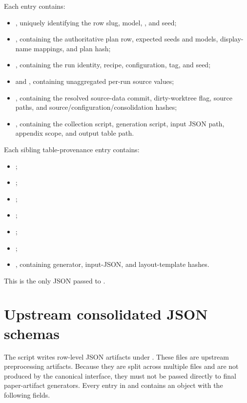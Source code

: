 \documentclass[11pt]{article}
\begin{document}
Each entry contains:
\begin{itemize}
  \item {}, uniquely identifying the row slug, model, \termSimulator, and seed;
  \item {}, containing the authoritative plan row, expected seeds and models, display-name mappings, and plan hash;
  \item {}, containing the run identity, recipe, configuration, tag, and seed;
  \item {} and , containing unaggregated per-run source values;
  \item {}, containing the resolved source-data commit, dirty-worktree flag, source paths, and source/configuration/consolidation hashes;
  \item {}, containing the collection script, generation script, input JSON path, appendix scope, and output table path.
\end{itemize}
Each sibling table-provenance entry contains:
\begin{itemize}
  \item {};
  \item {};
  \item {};
  \item {};
  \item {};
  \item {};
  \item {}, containing generator, input-JSON, and layout-template hashes.
\end{itemize}
This is the only JSON passed to .

\section{Upstream consolidated JSON schemas}
\label{sec:experiment-plan-consolidated-json-schema-appendix}

The  script writes row-level JSON artifacts under .
These files are upstream preprocessing artifacts. Because they are split across multiple files and are not produced by the canonical  interface, they must not be passed directly to final paper-artifact generators.
Every entry in  and  contains an  object with the following fields.
\end{document}
